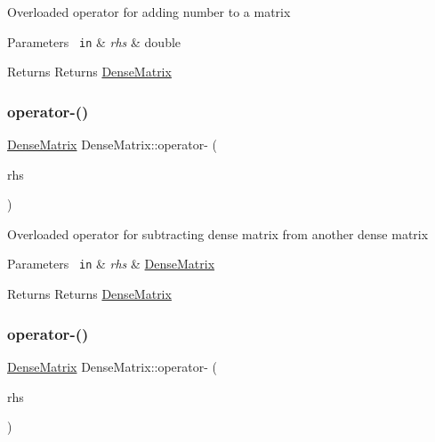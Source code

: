 Overloaded operator for adding number to a matrix 
\begin{DoxyParams}[1]{Parameters}
\mbox{\texttt{ in}}  & {\em rhs} & double \\
\hline
\end{DoxyParams}
\begin{DoxyReturn}{Returns}
Returns \mbox{\hyperlink{class_dense_matrix}{Dense\+Matrix}} 
\end{DoxyReturn}
\mbox{\label{class_dense_matrix_a2fa05956c14587935e9f16713c9993e8}} 
\subsubsection{\texorpdfstring{operator-\/()}{operator-()}\hspace{0.1cm}{\footnotesize\ttfamily [1/2]}}
{\footnotesize\ttfamily \mbox{\hyperlink{class_dense_matrix}{Dense\+Matrix}} Dense\+Matrix\+::operator-\/ (\begin{DoxyParamCaption}\item[{const \mbox{\hyperlink{class_dense_matrix}{Dense\+Matrix}} \&}]{rhs }\end{DoxyParamCaption})}

Overloaded operator for subtracting dense matrix from another dense matrix 
\begin{DoxyParams}[1]{Parameters}
\mbox{\texttt{ in}}  & {\em rhs} & \mbox{\hyperlink{class_dense_matrix}{Dense\+Matrix}} \\
\hline
\end{DoxyParams}
\begin{DoxyReturn}{Returns}
Returns \mbox{\hyperlink{class_dense_matrix}{Dense\+Matrix}} 
\end{DoxyReturn}
\mbox{\label{class_dense_matrix_aaa961b0319f042d0aadc56c598378c44}} 
\subsubsection{\texorpdfstring{operator-\/()}{operator-()}\hspace{0.1cm}{\footnotesize\ttfamily [2/2]}}
{\footnotesize\ttfamily \mbox{\hyperlink{class_dense_matrix}{Dense\+Matrix}} Dense\+Matrix\+::operator-\/ (\begin{DoxyParamCaption}\item[{const double \&}]{rhs }\end{DoxyParamCaption})}

